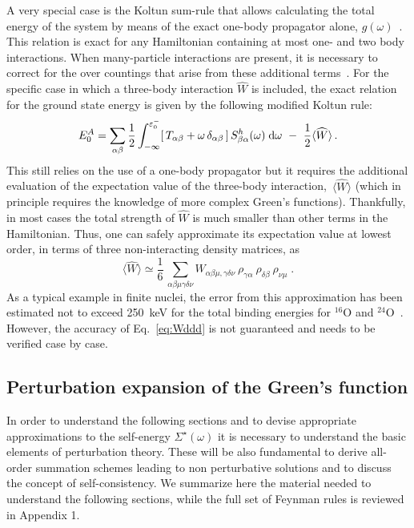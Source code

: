 A very special case is the Koltun sum-rule that allows calculating the total energy of the system by means of the exact one-body propagator alone, $g(\omega)$~\cite{ch11_Galitskii1958KSR,ch11_Koltun1974KSR}. 
This relation is exact for any Hamiltonian containing at most one- and two body interactions.  When many-particle interactions are present, it is necessary 
to correct for the over countings that arise from these additional terms~\cite{ch11_Carbone2013Nov}. For the specific case in which a three-body interaction $\widehat{W}$ is included, the exact relation for the ground state energy is given by the following modified Koltun rule:
\begin{equation}
  \label{eq:Koltun_hW}
  E^A_0 = \sum_{\alpha\beta} \frac{1}{2} 
            \int_{-\infty}^{\varepsilon^-_0}  [\,T_{\alpha\beta}+\omega\,\delta_{\alpha\beta}\, ]
            \, S^h_{\beta\alpha}(\omega) \; {\rm d}\omega
            ~-~  \frac{1}{2} \langle \widehat W\rangle \, .
\end{equation}
This still relies on the use of a one-body propagator but
 it requires  the additional evaluation of the expectation value of the three-body interaction,~$\langle \widehat W \rangle$ (which in principle requires the knowledge of more complex Green's functions).
%
Thankfully, in most cases the total strength of $\widehat{W}$ is much smaller than other terms in the Hamiltonian. Thus, one can safely approximate its expectation value at lowest order, in terms of three  non-interacting density matrices, as
\begin{equation}
   \label{eq:Wddd}
    \langle \widehat W\rangle\simeq\frac{1}{6} \, \sum_{\alpha\beta\mu\gamma\delta\nu} W_{\alpha\beta\mu,\gamma\delta\nu}~\rho_{\gamma\alpha}~\rho_{\delta\beta}~\rho_{\nu\mu} \; .
\end{equation}
%
As a typical example in finite nuclei, the error from this approximation has been estimated not to exceed 250~keV for the total binding energies for $^{16}$O and $^{24}$O~\cite{ch11_Cipollone2013prl}. However, the accuracy of Eq.~\eqref{eq:Wddd} is not guaranteed and needs to be verified case by case.


\subsection{Perturbation expansion of the Green's function}
\label{sec:pertexp}

In order to understand the following sections and to devise appropriate approximations to the self-energy $\Sigma^{\star}(\omega)$ it is necessary to understand the basic elements of perturbation theory.  These will be also fundamental to derive all-order summation schemes leading to non perturbative solutions and to discuss the concept of self-consistency. We summarize here the material needed to understand the following sections, while the full set of Feynman rules is reviewed in  Appendix 1.

